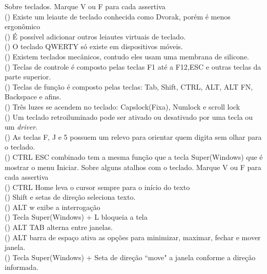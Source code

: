 \documentclass[12pt]{exam}
\begin{document}
\begin{questions}
\question Sobre teclados. Marque V ou F para cada assertiva\\
(\hspace{6px}) Existe um leiaute de teclado conhecida como Dvorak, porém é menos ergonômico\\
(\hspace{6px}) É possível adicionar outros leiautes virtuais de teclado. \\
(\hspace{6px}) O teclado QWERTY só existe em dispositivos móveis. \\
(\hspace{6px}) Existem teclados mecânicos, contudo eles usam uma membrana de silicone. \\
(\hspace{6px}) Teclas de controle é composto pelas teclas F1 até a F12,ESC e outras teclas da parte superior. \\
(\hspace{6px}) Teclas de função é composto pelas teclas: Tab, Shift, CTRL, ALT, ALT FN, Backspace e afins. \\
(\hspace{6px}) Três luzes se acendem no teclado: Capslock(Fixa), Numlock e scroll lock\\
(\hspace{6px}) Um teclado retroiluminado pode ser ativado ou desativado por uma tecla ou um \textit{driver}. \\
(\hspace{6px}) As teclas F, J e 5 possuem um relevo para orientar quem digita sem olhar para o teclado.\\
(\hspace{6px}) CTRL ESC combinado tem a mesma função que a tecla Super(Windows) que é mostrar o menu Iniciar.
\question Sobre alguns atalhos com o teclado. Marque V ou F para cada assertiva\\
(\hspace{6px}) CTRL Home leva o cursor sempre para o início do texto\\
(\hspace{6px}) Shift e setas de direção seleciona texto. \\
(\hspace{6px}) ALT w exibe a interrogação \\
(\hspace{6px}) Tecla Super(Windows) + L bloqueia a tela \\
(\hspace{6px}) ALT TAB alterna entre janelas. \\
(\hspace{6px}) ALT barra de espaço ativa as opções para minimizar, maximar, fechar e mover janela. \\
(\hspace{6px}) Tecla Super(Windows) + Seta de direção ``move" a janela conforme a direção informada. 


\end{questions}
\end{document}
